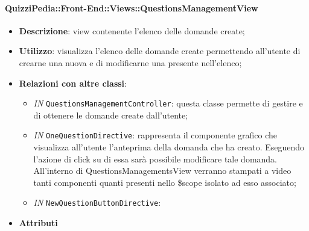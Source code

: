 \paragraph{QuizziPedia::Front-End::Views::QuestionsManagementView}
\begin{itemize}
	\item \textbf{Descrizione}: view contenente l'elenco delle domande create; 
	\item \textbf{Utilizzo}: visualizza l'elenco delle domande create permettendo all'utente di crearne una nuova e di modificarne una presente nell'elenco;
	\item \textbf{Relazioni con altre classi}:
	\begin{itemize}
		\item \textit{IN} \texttt{QuestionsManagementController}: questa classe permette di gestire e di ottenere le domande create dall'utente;
		\item \textit{IN} \texttt{OneQuestionDirective}: rappresenta il componente grafico che visualizza all'utente l'anteprima della domanda che ha creato. Eseguendo l'azione di click su di essa sarà possibile modificare
		tale domanda. All'interno di QuestionsManagementsView verranno stampati a video tanti componenti quanti presenti nello \$scope isolato ad esso associato;
		\item \textit{IN} \texttt{NewQuestionButtonDirective}: 
	\end{itemize}
	\item \textbf{Attributi}
\end{itemize}

